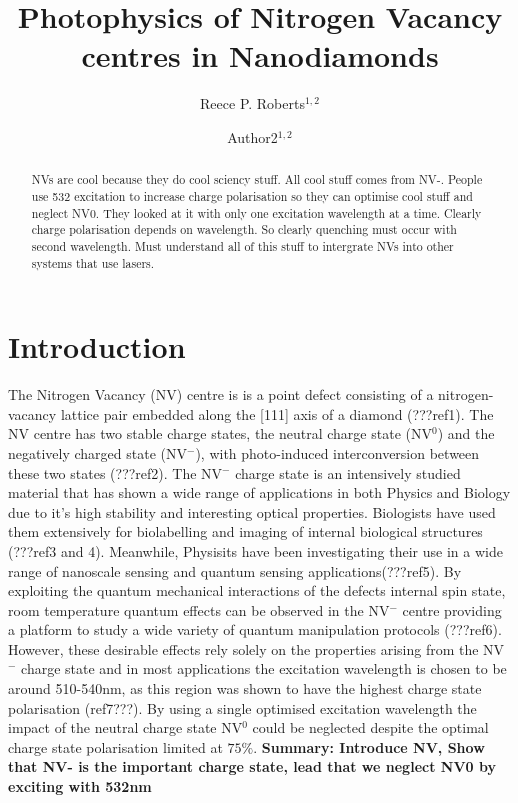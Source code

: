 \documentclass[,prl,twocolumn]{revtex4}
\begin{document}
\title{Photophysics of Nitrogen Vacancy centres in Nanodiamonds}
  
\author{Reece P. Roberts$^{1,2}$}
\author{Author2$^{1,2}$}



\begin{abstract}
NVs are cool because they do cool sciency stuff.
All cool stuff comes from NV-.
People use 532 excitation to increase charge polarisation so they can optimise cool stuff and neglect NV0.
They looked at it with only one excitation wavelength at a time. 
Clearly charge polarisation depends on wavelength.
So clearly quenching must occur with second wavelength.
Must understand all of this stuff to intergrate NVs into other systems that use lasers.
\end{abstract}

\maketitle

\section{Introduction}

The Nitrogen Vacancy (NV) centre is is a point defect consisting of a nitrogen-vacancy lattice pair embedded along the [111] axis of a diamond (???ref1). The NV centre has two stable charge states, the neutral charge state (NV$^0$) and the negatively charged state (NV$^-$), with photo-induced interconversion between these two states (???ref2). The NV$^-$ charge state is an intensively studied material that has shown a wide range of applications in both Physics and Biology due to it's high stability and interesting optical properties. Biologists have used them extensively for biolabelling and imaging of internal biological structures (???ref3 and 4). Meanwhile, Physisits have been investigating their use in a wide range of nanoscale sensing and quantum sensing applications(???ref5). By exploiting the quantum mechanical interactions of the defects internal spin state, room temperature quantum effects can be observed in the NV$^-$ centre providing a platform to study a wide variety of quantum manipulation protocols (???ref6). However, these desirable effects rely solely on the properties arising from the NV$^-$ charge state and in most applications the excitation wavelength is chosen to be around 510-540nm, as this region was shown to have the highest charge state polarisation (ref7???). By using a single optimised excitation wavelength the impact of the neutral charge state NV$^0$ could be neglected despite the optimal charge state polarisation limited at $75\%$. \textbf{Summary: Introduce NV, Show that NV- is the important charge state, lead that we neglect NV0 by exciting with 532nm}
\end{document}
